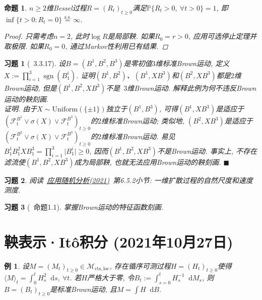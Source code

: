 \documentclass{ctexart}
\theoremstyle{definition}
\theoremstyle{remark}
\theoremstyle{plain}
\newtheorem{Prop}[Def]{命题}
\newtheorem{Eg}[Def]{例}
\newtheorem{Ex}{习题}[section]
\newenvironment{Prf}{\vspace{1ex}\textbf{\\}{\color{red}\textit{证明}}.\normalfont}{\color{red}\hfill$\blacksquare$\vspace{1ex}\par}
\newcommand{\1}{\mathbbm{1}}				%
\newcommand{\as}{\mathrm{a.s.}}				%
\renewcommand{\P}{\mathbb{P}}				%
\newcommand{\agp}[1]{\langle #1 \rangle}	%
\newcommand{\sgn}[1]{\operatorname{sgn}(#1)}	%
\newcommand{\abs}[1]{\lvert#1\rvert}			%
\renewcommand*{\d}{\mathop{}\!\mathrm{d}}	%
\begin{document}
\begin{Prop}
$n \ge 2$维Bessel过程$R = (R_{t})_{t \ge 0}$满足$\P\{ R_{t} > 0 ,\ \forall t > 0 \} = 1$, 即$\inf\{ t > 0 : R_{t} = 0 \} \stackrel{\as}{=} \infty$.
\begin{proof}
只需考虑$n = 2$, 此时$\log R$是局部鞅. 如果$R_{0} = r > 0$, 应用可选停止定理并取极限. 如果$R_{0} = 0$, 通过Markov性利用已有结果.
\end{proof}
\end{Prop}


\begin{Ex}[\cite{Karatzas-Shreve--GTM113}~3.3.17]
设$B = (B^{1},B^{2},B^{3})$是零初值$3$维标准Brown运动, 定义$X := \prod_{i=1}^{3} \sgn{B^{i}_{1}}$. 证明$(B^{1},B^{2})$、$(B^{1},XB^{3})$和$(B^{2},XB^{3})$都是$2$维Brown运动, 但是$(B^{1},B^{2},XB^{3})$\emph{不是}~$3$维Brown运动. 解释此例为何不违反Brown运动的鞅刻画.
\begin{Prf}
由于$X \sim \mathrm{Uniform}(\{\pm 1\})$独立于$(B^{1},B^{3})$, 可得$(B^{1},XB^{3})$是适应于$(\mathscr{F}_{t}^{B^1}\vee\sigma(X)\vee\mathscr{F}_{t}^{B^3})_{t \ge 0}$的$2$维标准Brown运动; 类似地, $(B^{2},XB^{3})$是适应于$(\mathscr{F}_{t}^{B^2}\vee\sigma(X)\vee\mathscr{F}_{t}^{B^3})_{t \ge 0}$的$2$维标准Brown运动. 易见$B^{1}_{1}B^{2}_{1}XB^{3}_{1} = \prod_{i=1}^{3} \abs{B^{i}_{1}} \ge 0$, 因而$(B^{1},B^{2},XB^{3})$不是Brown运动. 事实上, 不存在滤流使$(B^{1},B^{2},XB^{3})$成为局部鞅, 也就无法应用Brown运动的鞅刻画.
\end{Prf}
\end{Ex}


\begin{Ex}
阅读~\!\href{https://www.math.pku.edu.cn/teachers/liuyong/asa/lectnote21.pdf}{应用随机分析(2021)}~第6.5.2小节: 一维扩散过程的自然尺度和速度测度.
\end{Ex}


\begin{Ex}[\cite{龚光鲁-钱敏平}~命题1.1]
掌握Brown运动的特征函数刻画.
\end{Ex}



\section{鞅表示·It\^{o}积分 \normalfont\footnotesize (2021年10月27日)}
\begin{Eg}
设$M = (M_{t})_{t \ge 0} \in \mathcal{M}_{\mathrm{cts},\mathrm{loc}}$, 存在循序可测过程$H = (H_{t})_{t \ge 0}$使得$\agp{M}_{t} = \int_{0}^{t} H_{s}^{2} \d s$, $\forall t$. 若$H$严格大于零, 令$B_{t} := \int_{s=0}^{t} H_{s}^{-1} \d M_{s}$, 则$B = (B_{t})_{t \ge 0}$是标准Brown运动, 且$M = \int H \d B$.
\end{Eg}
\end{document}
